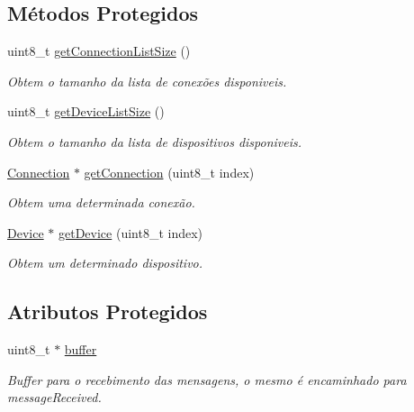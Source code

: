 \subsection*{Métodos Protegidos}
\begin{DoxyCompactItemize}
\item 
uint8\-\_\-t \hyperlink{classRobot_a6ef66669b08d6c17e249d946eec87f2d}{get\-Connection\-List\-Size} ()
\begin{DoxyCompactList}\small\item\em Obtem o tamanho da lista de conexões disponiveis. \end{DoxyCompactList}\item 
uint8\-\_\-t \hyperlink{classRobot_a09b95280d83027439d27749ba2c0bc4a}{get\-Device\-List\-Size} ()
\begin{DoxyCompactList}\small\item\em Obtem o tamanho da lista de dispositivos disponiveis. \end{DoxyCompactList}\item 
\hyperlink{classConnection}{Connection} $\ast$ \hyperlink{classRobot_a6e96ee4f33816dd91cd76d950e134b53}{get\-Connection} (uint8\-\_\-t index)
\begin{DoxyCompactList}\small\item\em Obtem uma determinada conexão. \end{DoxyCompactList}\item 
\hyperlink{classDevice}{Device} $\ast$ \hyperlink{classRobot_af5e50d99c051a6b25dfc561535111444}{get\-Device} (uint8\-\_\-t index)
\begin{DoxyCompactList}\small\item\em Obtem um determinado dispositivo. \end{DoxyCompactList}\end{DoxyCompactItemize}
\subsection*{Atributos Protegidos}
\begin{DoxyCompactItemize}
\item 
uint8\-\_\-t $\ast$ \hyperlink{classRobot_aef6f636eb10e6b4998a3b1859ca71500}{buffer}
\begin{DoxyCompactList}\small\item\em Buffer para o recebimento das mensagens, o mesmo é encaminhado para {\ttfamily message\-Received}. \end{DoxyCompactList}\end{DoxyCompactItemize}
